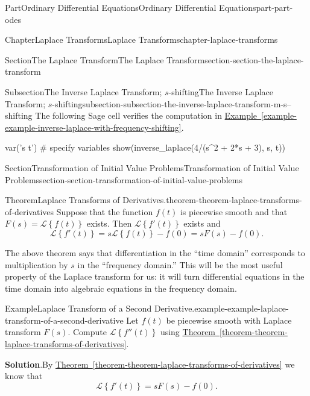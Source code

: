 \documentclass[twoside,10pt,]{book}
\newcommand{\blocktitlefont}{\relax}
\newcommand{\xreffont}{\relax}
\numberwithin{equation}{part}
\newcommand{\Laplace}[1]{\mathcal{L}\set{#1}}
\newcommand{\set}[1]{\left\{ #1 \right\}}
\begin{document}
\begin{partptx}{Part}{Ordinary Differential Equations}{}{Ordinary Differential Equations}{}{}{part-part-odes}
\begin{chapterptx}{Chapter}{Laplace Transforms}{}{Laplace Transforms}{}{}{chapter-laplace-transforms}
\begin{sectionptx}{Section}{The Laplace Transform}{}{The Laplace Transform}{}{}{section-section-the-laplace-transform}
\begin{subsectionptx}{Subsection}{The Inverse Laplace Transform; \(s\)-shifting}{}{The Inverse Laplace Transform; \(s\)-shifting}{}{}{subsection-subsection-the-inverse-laplace-transform-m-s--shifting}
The following Sage cell verifies the computation in \hyperref[example-example-inverse-laplace-with-frequency-shifting]{Example~{\xreffont\ref{example-example-inverse-laplace-with-frequency-shifting}}}.%
\begin{sageinput}
var('s t') # specify variables
show(inverse_laplace(4/(s^2 + 2*s + 3), s, t))
\end{sageinput}
\end{subsectionptx}
\end{sectionptx}
%
%
\typeout{************************************************}
\typeout{************************************************}
%
\begin{sectionptx}{Section}{Transformation of Initial Value Problems}{}{Transformation of Initial Value Problems}{}{}{section-section-transformation-of-initial-value-problems}
\begin{theorem}{Theorem}{Laplace Transforms of Derivatives.}{}{theorem-theorem-laplace-transforms-of-derivatives}%
Suppose that the function \(f(t)\) is piecewise smooth and that \(F(s) = \Laplace{f(t)}\) exists. Then \(\Laplace{f'(t)}\) exists and%
\begin{equation*}
\Laplace{f'(t)} = s\Laplace{f(t)}-f(0) = sF(s)-f(0).
\end{equation*}
%
\end{theorem}
The above theorem says that differentiation in the ``time domain'' corresponds to multiplication by \(s\) in the ``frequency domain.'' This will be the most useful property of the Laplace transform for us: it will turn differential equations in the time domain into algebraic equations in the frequency domain.%
\begin{example}{Example}{Laplace Transform of a Second Derivative.}{example-example-laplace-transform-of-a-second-derivative}%
Let \(f(t)\) be piecewise smooth with Laplace transform \(F(s)\). Compute \(\Laplace{f''(t)}\) using \hyperref[theorem-theorem-laplace-transforms-of-derivatives]{Theorem~{\xreffont\ref{theorem-theorem-laplace-transforms-of-derivatives}}}.%
\par\smallskip%
\noindent\textbf{\blocktitlefont Solution}.\hypertarget{solution-example-laplace-transform-of-a-second-derivative-c}{}\quad{}By \hyperref[theorem-theorem-laplace-transforms-of-derivatives]{Theorem~{\xreffont\ref{theorem-theorem-laplace-transforms-of-derivatives}}} we know that%
\begin{equation*}
\Laplace{f'(t)} = sF(s)-f(0).
\end{equation*}

\end{example}
\end{sectionptx}
\end{chapterptx}
\end{partptx}
\end{document}
